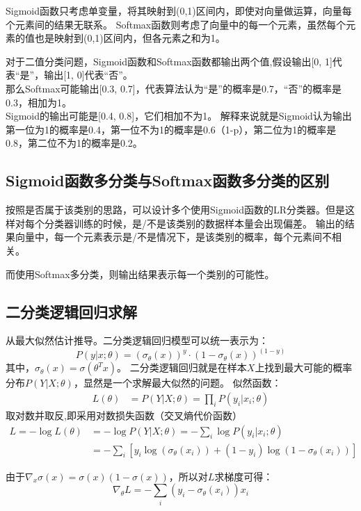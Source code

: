 Sigmoid函数只考虑单变量，将其映射到(0,1)区间内，即使对向量做运算，向量每个元素间的结果无联系。
Softmax函数则考虑了向量中的每一个元素，虽然每个元素的值也是映射到(0,1)区间内，但各元素之和为1。

对于二值分类问题，Sigmoid函数和Softmax函数都输出两个值,假设输出[0, 1]代表“是”，输出[1, 0]代表“否”。\\
那么Softmax可能输出[0.3, 0.7]，代表算法认为“是”的概率是0.7，“否”的概率是0.3，相加为1。\\
Sigmoid的输出可能是[0.4, 0.8]，它们相加不为1。
解释来说就是Sigmoid认为输出第一位为1的概率是0.4，第一位不为1的概率是0.6（1-p），第二位为1的概率是0.8，第二位不为1的概率是0.2。

\subsection{Sigmoid函数多分类与Softmax函数多分类的区别}
按照是否属于该类别的思路，可以设计多个使用Sigmoid函数的LR分类器。但是这样对每个分类器训练的时候，是/不是该类别的数据样本量会出现偏差。
输出的结果向量中，每一个元素表示是/不是情况下，是该类别的概率，每个元素间不相关。

而使用Softmax多分类，则输出结果表示每一个类别的可能性。

\subsection{二分类逻辑回归求解}
从最大似然估计推导。二分类逻辑回归模型可以统一表示为：
\begin{equation*}
    P(y|x;\theta) = (\sigma_\theta(x))^y \cdot (1-\sigma_\theta(x))^{(1-y)}
\end{equation*}
其中，$\sigma_\theta(x) = \sigma(\theta^T x)$。
二分类逻辑回归就是在样本$X$上找到最大可能的概率分布$P(Y|X;\theta)$，显然是一个求解最大似然的问题。
似然函数：
\begin{align*}
    L(\theta) &= P(Y|X;\theta) = \prod_i P(y_i|x_i;\theta) 
\end{align*}
取对数并取反,即采用对数损失函数（交叉熵代价函数）
\begin{align*}
    L = -\log L(\theta) &= -\log P(Y|X;\theta) = -\sum_i \log P(y_i|x_i;\theta) \\ 
    &= - \sum_i \left[ y_i \log (\sigma_\theta(x_i)) + (1-y_i) \log (1-\sigma_\theta(x_i))\right]
\end{align*}

由于$\nabla_x \sigma(x) = \sigma(x)(1-\sigma(x))$，所以对$L$求梯度可得：
\begin{equation*}
    \nabla_\theta L = -\sum_i (y_i - \sigma_\theta(x_i))x_i
\end{equation*}

